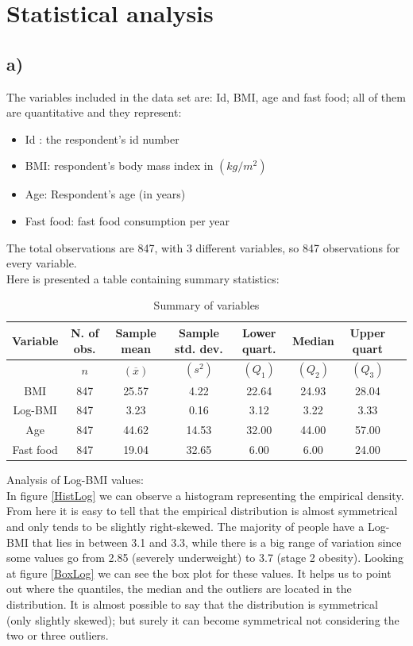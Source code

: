 \section{Statistical analysis} 

\subsection{a)}
The variables included in the data set are: Id, BMI, age and fast food; all of them are quantitative and they represent:
\begin{itemize}
    \item Id : the respondent's id number 
    \item BMI: respondent's body mass index in $(kg/m^2)$
    \item Age: Respondent's age (in years)
    \item Fast food: fast food consumption per year
\end{itemize}
The total observations are 847, with 3 different variables, so 847 observations for every variable. \\
Here is presented a table containing summary statistics:
\begin{table}[h!]
\centering
\begin{tabular}{|c||c|c|c|c|c|c|c|}
  \hline
\parbox{1.5cm}{\textbf{Variable}} & \textbf{N. of obs.} & \parbox{1.5cm}{\textbf{Sample mean}} & \parbox{1.5cm}{\textbf{Sample std. dev.}} & \parbox{1.5cm}{\textbf{Lower quart.}} & \textbf{Median} & \parbox{1.5cm}{\textbf{Upper quart}} \\ 
 \hline
  & $n$ & $(\overline{x})$ & $(s^2)$ & $(Q_1)$ & $(Q_2)$ & $(Q_3)$ \\
  \hline
  \hline
BMI & 847 & 25.57 & 4.22 & 22.64 & 24.93 & 28.04 \\ 
  \hline
Log-BMI & 847 & 3.23 & 0.16 & 3.12 & 3.22 & 3.33 \\ 
    \hline
Age & 847 & 44.62 & 14.53 & 32.00 & 44.00 & 57.00 \\ 
   \hline
Fast food & 847 & 19.04 & 32.65 & 6.00 & 6.00 & 24.00 \\ 
   \hline
\end{tabular}
\caption{Summary of variables}
\label{SumAll}
\end{table} 
\newpage
Analysis of Log-BMI values: \\
In figure \ref{HistLog} we can observe a histogram representing the empirical density. From here it is easy to tell that the empirical distribution is almost symmetrical and only tends to be slightly right-skewed. The majority of people have a Log-BMI that lies in between 3.1 and 3.3, while there is a big range of variation since some values go from 2.85 (severely underweight) to 3.7 (stage 2 obesity). Looking at figure \ref{BoxLog} we can see the box plot for these values. It helps us to point out where the quantiles, the median and the outliers are located in the distribution. It is almost possible to say that the distribution is symmetrical (only slightly skewed); but surely it can become symmetrical not considering the two or three outliers. \\ 
